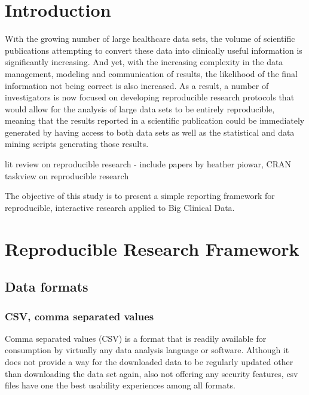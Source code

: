 \documentclass[twoside]{article}
\begin{document}
\begin{multicols}{2} %

\section{Introduction}

\lettrine[nindent=0em,lines=3]{W} ith the growing number of large healthcare data sets, the volume of scientific publications attempting to convert these data into clinically useful information is significantly increasing. 
And yet, with the increasing complexity in the data management, modeling and communication of results, the likelihood of the final information not being correct is also increased. 
As a result, a number of investigators is now focused on developing reproducible research protocols that would allow for the analysis of large data sets to be entirely reproducible, meaning that the results reported in a scientific publication could be immediately generated by having access to both data sets as well as the statistical and data mining scripts generating those results. 

lit review on reproducible research - include papers by heather piowar, CRAN taskview on reproducible research

The objective of this study is to present a simple reporting framework for reproducible, interactive research applied to Big Clinical Data.



\section{Reproducible Research Framework}

\subsection{Data formats}

\subsubsection{CSV, comma separated values} 
 
Comma separated values (CSV) is a format that is readily available for consumption by virtually any data analysis language or software. 
Although it does not provide a way for the downloaded data to be regularly updated other than downloading the data set again, also not offering any security features, csv files have one the best usability experiences among all formats. %


\end{multicols}
\end{document}
